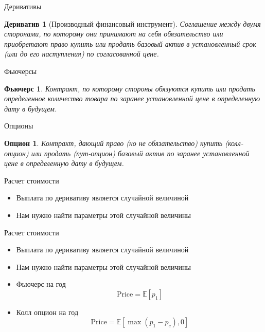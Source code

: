 \documentclass{beamer}
\newtheorem{derivative*}{Дериватив}
\newtheorem{futures*}{Фьючерс}
\newtheorem{option*}{Опцион}
\newcommand{\E}{\ensuremath{\mathbb{E}}}
\begin{document}
    \begin{frame}{Деривативы}
        \begin{derivative*}[Производный финансовый инструмент]
            Соглашение между двумя сторонами, по которому они принимают на себя обязательство или приобретают право купить или продать базовый актив в установленный срок (или до его наступления) по согласованной цене.
        \end{derivative*}
    \end{frame}

    \begin{frame}{Фьючерсы}
        \begin{futures*}
            Контракт, по которому стороны обязуются купить или продать определенное количество товара по заранее установленной цене в определенную дату в будущем.
        \end{futures*}
    \end{frame}

    \begin{frame}{Опционы}
        \begin{option*}
            Контракт, дающий право (но не обязательство) купить (колл-опцион) или продать (пут-опцион) базовый актив по заранее установленной цене в определенную дату в будущем.
        \end{option*}
    \end{frame}

    \begin{frame}{Расчет стоимости}
        \begin{itemize}
            \item Выплата по деривативу является случайной величиной
            \item Нам нужно найти параметры этой случайной величины
        \end{itemize}
    \end{frame}

    \begin{frame}{Расчет стоимости}
        \begin{itemize}
            \item Выплата по деривативу является случайной величиной
            \item Нам нужно найти параметры этой случайной величины
        \end{itemize}
        \begin{itemize}
            \item Фьючерс на год
            \[
                \mathrm{Price} = \E \left[ p_1 \right]
            \]
            \item Колл опцион на год
            \[
                \mathrm{Price} = \E \left[ \max{(p_1 - p_c), 0} \right]
            \]
        \end{itemize}
    \end{frame}
\end{document}
